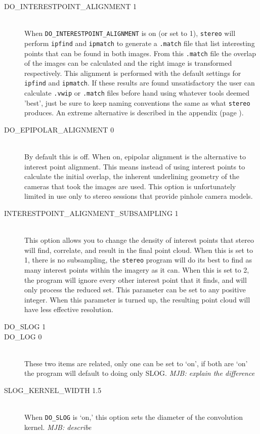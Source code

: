 \begin{description}
\item[DO\_INTERESTPOINT\_ALIGNMENT 1] \hfill \\ When
  \texttt{DO\_INTERESTPOINT\_ALIGNMENT} is on (or set to 1),
  \texttt{stereo} will perform \texttt{ipfind} and \texttt{ipmatch} to
  generate a \texttt{.match} file that list interesting points that
  can be found in both images. From this \texttt{.match} file the
  overlap of the images can be calculated and the right image is
  transformed respectively. This alignment is performed with the
  default settings for \texttt{ipfind} and \texttt{ipmatch}. If these
  results are found unsatisfactory the user can calculate
  \texttt{.vwip} or \texttt{.match} files before hand using whatever
  tools deemed 'best', just be sure to keep naming conventions the
  same as what \texttt{stereo} produces. An extreme alternative is
  described in the appendix (page \pageref{appendix_surf}).

\item[DO\_EPIPOLAR\_ALIGNMENT 0] \hfill \\ By default this is off.
  When on, epipolar alignment is the alternative to interest point
  alignment. This means instead of using interest points to calculate
  the initial overlap, the inherent underlining geometry of the
  cameras that took the images are used. This option is unfortunately
  limited in use only to stereo sessions that provide pinhole camera
  models.

\item[INTERESTPOINT\_ALIGNMENT\_SUBSAMPLING 1] \hfill \\
This option allows you to change the density of interest points
that stereo will find, correlate, and result in the final point
cloud.  When this is set to 1, there is no subsampling, the
\texttt{stereo} program will do its best to find as many interest
points within the imagery as it can.  When this is set to 2, the
program will ignore every other interest point that it finds, and
will only process the reduced set.  This parameter can be set to
any positive integer.  When this parameter is turned up, the resulting
point cloud will have less effective resolution.

\item[DO\_SLOG 1]
\item[DO\_LOG 0] \hfill \\
These two items are related, only one can be set to `on', if both
are `on' the program will default to doing only SLOG.  \emph{MJB: explain the difference}

\item[SLOG\_KERNEL\_WIDTH 1.5] \hfill \\
When \texttt{DO\_SLOG} is `on,' this option sets the diameter of
the convolution kernel. \emph{MJB: describe}

\end{description}

